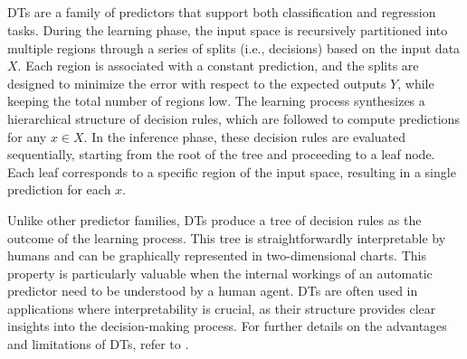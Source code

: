 \subsection[Decision trees]{}\label{subsubsec:non-neural-models}
%
\Glspl{DT} are a family of predictors that support both classification and regression tasks.
%
During the learning phase, the input space is recursively partitioned into multiple regions through a series of splits (i.e., decisions) based on the input data \(X\).
%
Each region is associated with a constant prediction, and the splits are designed to minimize the error with respect to the expected outputs \(Y\), while keeping the total number of regions low.
%
The learning process synthesizes a hierarchical structure of decision rules, which are followed to compute predictions for any \(x \in X\).
%
In the inference phase, these decision rules are evaluated sequentially, starting from the root of the tree and proceeding to a leaf node.
%
Each leaf corresponds to a specific region of the input space, resulting in a single prediction for each \(x\).

Unlike other predictor families, \glspl{DT} produce a tree of decision rules as the outcome of the learning process.
%
This tree is straightforwardly interpretable by humans and can be graphically represented in two-dimensional charts.
%
This property is particularly valuable when the internal workings of an automatic predictor need to be understood by a human agent.
%
\Glspl{DT} are often used in applications where interpretability is crucial, as their structure provides clear insights into the decision-making process.
%
For further details on the advantages and limitations of \glspl{DT}, refer to .


\subsection[Random forests]{}\label{subsec:random-forests}

\subsection[Support vector machines]{}\label{subsec:svm}

